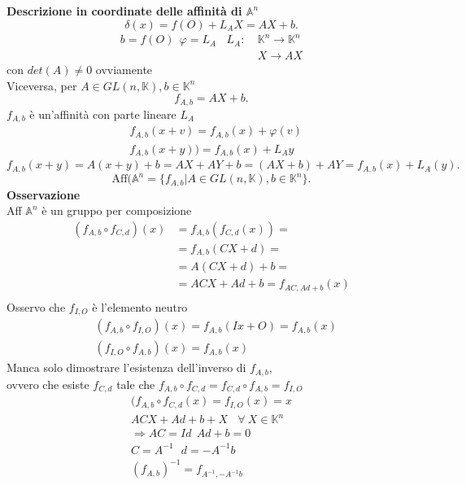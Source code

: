 \documentclass[12px]{article}
\begin{document}
\textbf{Descrizione in coordinate delle affinità di $ \mathbb{A} ^n$} \\
	\[
	\delta (x) = f(O) + L_A X = AX + b
	.\]
	\begin{align*}
		b = f(O) \ \ \varphi = L_A \ \ \ \ L_A : \ &\mathbb{K}^n \rightarrow \mathbb{K}^n \\ 
						    	 & X \rightarrow AX
	\end{align*}
	con $det(A) \neq 0$ ovviamente\\
	Viceversa, per $A\in GL(n,\mathbb{K}), b\in\mathbb{K}^n$\\
	\[
		f_{A,b} = AX + b
	.\] 
	$f_{A,b}$ è un'affinità con parte lineare $L_A$
	\begin{align*}
		& f_{A,b}(x + v) = f_{A,b}(x) + \varphi(v) \\
		& f_{A,b}(x + y)) = f_{A,b}(x) + L_Ay
	\end{align*}
	\[
		f_{A,b}(x + y) = A(x + y) + b = AX + AY + b = (AX + b) + AY = f_{A,b} (x) + L_A(y)
	.\] 
	\[
		\text{Aff}( \mathbb{A}^n =\{f_{A,b} | A\in GL(n,\mathbb{K}), b\in\mathbb{K}^n\}
	.\] 
	\textbf{Osservazione} \\
	Aff $ \mathbb{A} ^n$ è un gruppo per composizione \\ 
	\begin{align*}
		(f_{A,b}\circ f_{C,d})(x)  &= f_{A,b}(f_{C,d}(x)) =\\
					   &= f_{A,b}(CX + d) = \\
					   &=A(CX + d) + b =\\
					   &=ACX + Ad + b = f_{AC, Ad + b}(x) \\
	\end{align*}
	Osservo che $f_{I,O}$ è l'elemento neutro
	\begin{align*}
		&(f_{A,b}\circ f_{I,O})(x) = f_{A,b}(Ix + O) = f_{A,b}(x) \\
		&(f_{I,O}\circ f_{A,b})(x) = f_{A,b}(x)
	\end{align*}
	Manca solo dimostrare l'esistenza dell'inverso di $f_{A,b}$,\\
	ovvero che esiste $f_{C,d}$ tale che $f_{A,b}\circ f_{C,d} = f_{C,d}\circ f_{A,b} = f_{I,O}$
	\begin{align*}
		(f_{A,b}\circ f_{C,d}(x) = f_{I,O}(x) = x \\
		ACX + Ad + b + X \ \ \ \ \forall \  X\in\mathbb{K}^n \\
		\Rightarrow AC = Id \ \ Ad + b = 0\\
		C = A^{-1} \ \ \ d = -A^{-1}b \\
		(f_{A,b})^{-1} = f_{A^{-1}, -A^{-1}b}
	\end{align*}
	
\end{document}
